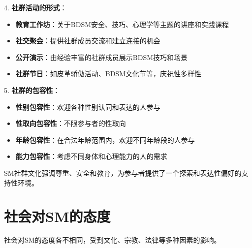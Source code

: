 \documentclass[12pt,UTF8]{ctexbook}
\begin{document}
4. \textbf{社群活动的形式}：
  \begin{itemize}
  \item \textbf{教育工作坊}：关于BDSM安全、技巧、心理学等主题的讲座和实践课程
  \item \textbf{社交聚会}：提供社群成员交流和建立连接的机会
  \item \textbf{公开演示}：由经验丰富的社群成员展示BDSM技巧和场景
  \item \textbf{社群节日}：如皮革骄傲活动、BDSM文化节等，庆祝性多样性
  \end{itemize}

5. \textbf{社群的包容性}：
  \begin{itemize}
  \item \textbf{性别包容性}：欢迎各种性别认同和表达的人参与
  \item \textbf{性取向包容性}：不限参与者的性取向
  \item \textbf{年龄包容性}：在合法年龄范围内，欢迎不同年龄段的人参与
  \item \textbf{能力包容性}：考虑不同身体和心理能力的人的需求
  \end{itemize}

SM社群文化强调尊重、安全和教育，为参与者提供了一个探索和表达性偏好的支持性环境。

\section{社会对SM的态度}

社会对SM的态度各不相同，受到文化、宗教、法律等多种因素的影响。
\end{document}
